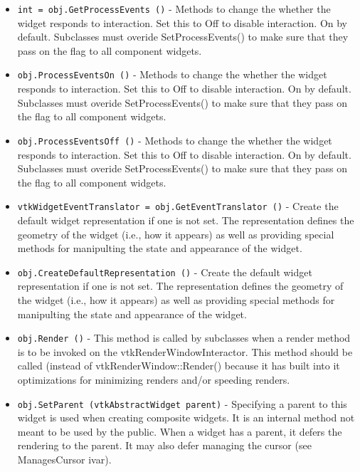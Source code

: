 \begin{itemize}
\item  \verb|int = obj.GetProcessEvents ()| -  Methods to change the whether the widget responds to interaction.
 Set this to Off to disable interaction. On by default.
 Subclasses must overide SetProcessEvents() to make sure
 that they pass on the flag to all component widgets.

\item  \verb|obj.ProcessEventsOn ()| -  Methods to change the whether the widget responds to interaction.
 Set this to Off to disable interaction. On by default.
 Subclasses must overide SetProcessEvents() to make sure
 that they pass on the flag to all component widgets.

\item  \verb|obj.ProcessEventsOff ()| -  Methods to change the whether the widget responds to interaction.
 Set this to Off to disable interaction. On by default.
 Subclasses must overide SetProcessEvents() to make sure
 that they pass on the flag to all component widgets.

\item  \verb|vtkWidgetEventTranslator = obj.GetEventTranslator ()| -  Create the default widget representation if one is not set. The
 representation defines the geometry of the widget (i.e., how it appears)
 as well as providing special methods for manipulting the state and
 appearance of the widget.

\item  \verb|obj.CreateDefaultRepresentation ()| -  Create the default widget representation if one is not set. The
 representation defines the geometry of the widget (i.e., how it appears)
 as well as providing special methods for manipulting the state and
 appearance of the widget.

\item  \verb|obj.Render ()| -  This method is called by subclasses when a render method is to be
 invoked on the vtkRenderWindowInteractor. This method should be called
 (instead of vtkRenderWindow::Render() because it has built into it
 optimizations for minimizing renders and/or speeding renders.

\item  \verb|obj.SetParent (vtkAbstractWidget parent)| -  Specifying a parent to this widget is used when creating composite
 widgets. It is an internal method not meant to be used by the public.
 When a widget has a parent, it defers the rendering to the parent. It
 may also defer managing the cursor (see ManagesCursor ivar).


\end{itemize}
